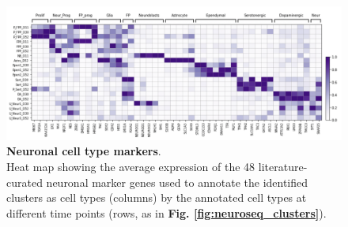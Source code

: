 \vspace{10mm}


\begin{figure}[h]
    \centering
    \includegraphics[width=16cm]{Appendix2/Fig/supl_neuroseq_markers.png}
    \caption[Neuronal cell type markers]{\textbf{Neuronal cell type markers}.\\
    Heat map showing the average expression of the 48 literature-curated neuronal marker genes used to annotate the identified clusters as cell types (columns) by the annotated cell types at different time points (rows, as in \textbf{Fig. \ref{fig:neuroseq_clusters}}).}
    \label{fig:suppl_celltype_markers}
\end{figure}

